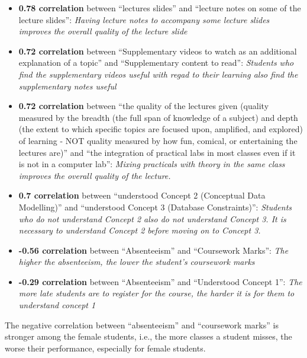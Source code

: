 \documentclass[
]{article}
\begin{document}
\begin{itemize}
\item
  \textbf{0.78 correlation} between ``lectures slides'' and ``lecture
  notes on some of the lecture slides'': \emph{Having lecture notes to
  accompany some lecture slides improves the overall quality of the
  lecture slide}
\item
  \textbf{0.72 correlation} between ``Supplementary videos to watch as
  an additional explanation of a topic'' and ``Supplementary content to
  read'': \emph{Students who find the supplementary videos useful with
  regad to their learning also find the supplementary notes useful}
\item
  \textbf{0.72 correlation} between ``the quality of the lectures given
  (quality measured by the breadth (the full span of knowledge of a
  subject) and depth (the extent to which specific topics are focused
  upon, amplified, and explored) of learning - NOT quality measured by
  how fun, comical, or entertaining the lectures are)'' and ``the
  integration of practical labs in most classes even if it is not in a
  computer lab'': \emph{Mixing practicals with theory in the same class
  improves the overall quality of the lecture.}
\item
  \textbf{0.7 correlation} between ``understood Concept 2 (Conceptual
  Data Modelling)'' and ``understood Concept 3 (Database Constraints)'':
  \emph{Students who do not understand Concept 2 also do not understand
  Concept 3. It is necessary to understand Concept 2 before moving on to
  Concept 3.}
\item
  \textbf{-0.56 correlation} between ``Absenteeism'' and ``Coursework
  Marks'': \emph{The higher the absenteeism, the lower the student's
  coursework marks}
\item
  \textbf{-0.29 correlation} between ``Absenteeism'' and ``Understood
  Concept 1'': \emph{The more late students are to register for the
  course, the harder it is for them to understand concept 1}
\end{itemize}

\newpage

The negative correlation between ``absenteeism'' and ``coursework
marks'' is stronger among the female students, i.e., the more classes a
student misses, the worse their performance, especially for female
students.
\end{document}
